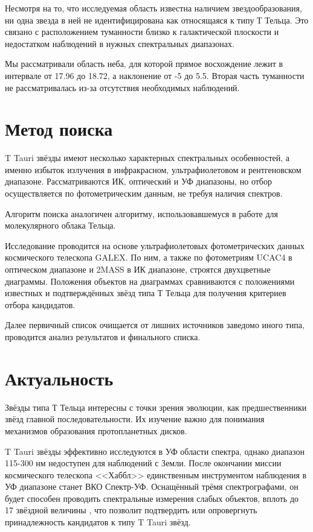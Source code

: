 Несмотря на то, что исследуемая область известна наличием звездообразования, ни одна звезда в ней не идентифицирована как относящаяся к типу Т Тельца. Это связано с расположением туманности близко к галактической плоскости и недостатком наблюдений в нужных спектральных диапазонах.

Мы рассматривали область неба, для которой прямое восхождение лежит в интервале от 17.96 до 18.72, а наклонение от -5 до 5.5. Вторая часть туманности не рассматривалась из-за отсутствия необходимых наблюдений.

\section{Метод поиска}
T Tauri звёзды имеют несколько характерных спектральных особенностей, а именно избыток излучения в инфракрасном, ультрафиолетовом и рентгеновском диапазоне. Рассматриваются ИК, оптический и УФ диапазоны, но отбор осуществляется по фотометрическим данным, не требуя наличия спектров.

Алгоритм поиска аналогичен алгоритму, использовавшемуся в работе \cite{AIGdC2014galex} для молекулярного облака Тельца.

Исследование проводится на основе ультрафиолетовых фотометрических данных космического телескопа GALEX. По ним, а также по фотометриям UCAC4 в оптическом диапазоне и 2MASS в ИК диапазоне, строятся двухцветные диаграммы. Положения объектов на диаграммах сравниваются с положениями известных и подтверждённых звёзд типа Т Тельца для получения критериев отбора кандидатов.

Далее первичный список очищается от лишних источников заведомо иного типа, проводится анализ результатов и финального списка.

\section{Актуальность}
Звёзды типа Т Тельца интересны с точки зрения эволюции, как предшественники звёзд главной последовательности. Их изучение важно для понимания механизмов образования протопланетных дисков.


T Tauri звёзды эффективно исследуются в УФ области спектра, однако диапазон 115-300 нм недоступен для наблюдений с Земли.
После окончании миссии космического телескопа <<Хаббл>> единственным инструментом наблюдения в УФ диапазоне станет ВКО Спектр-УФ. Оснащённый трёмя спектрографами, он будет способен проводить спектральные измерения слабых объектов, вплоть до 17 звёздной величины \cite{malkov2011scientific}, что позволит подтвердить или опровергнуть принадлежность кандидатов к типу T Tauri звёзд.

